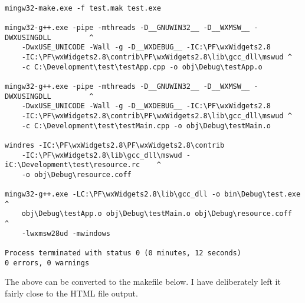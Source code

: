 \begin{verbatim}

mingw32-make.exe -f test.mak test.exe

mingw32-g++.exe -pipe -mthreads -D__GNUWIN32__ -D__WXMSW__ -DWXUSINGDLL         ^
    -DwxUSE_UNICODE -Wall -g -D__WXDEBUG__ -IC:\PF\wxWidgets2.8
    -IC:\PF\wxWidgets2.8\contrib\PF\wxWidgets2.8\lib\gcc_dll\mswud ^ 
    -c C:\Development\test\testApp.cpp -o obj\Debug\testApp.o

mingw32-g++.exe -pipe -mthreads -D__GNUWIN32__ -D__WXMSW__ -DWXUSINGDLL         ^
    -DwxUSE_UNICODE -Wall -g -D__WXDEBUG__ -IC:\PF\wxWidgets2.8
    -IC:\PF\wxWidgets2.8\contrib\PF\wxWidgets2.8\lib\gcc_dll\mswud ^ 
    -c C:\Development\test\testMain.cpp -o obj\Debug\testMain.o

windres -IC:\PF\wxWidgets2.8\PF\wxWidgets2.8\contrib
    -IC:\PF\wxWidgets2.8\lib\gcc_dll\mswud -iC:\Development\test\resource.rc    ^ 
    -o obj\Debug\resource.coff

mingw32-g++.exe -LC:\PF\wxWidgets2.8\lib\gcc_dll -o bin\Debug\test.exe          ^
    obj\Debug\testApp.o obj\Debug\testMain.o obj\Debug\resource.coff            ^
    -lwxmsw28ud -mwindows

Process terminated with status 0 (0 minutes, 12 seconds)
0 errors, 0 warnings
\end{verbatim}

The above can be converted to the makefile below. I have deliberately left it fairly close to the HTML file output.

